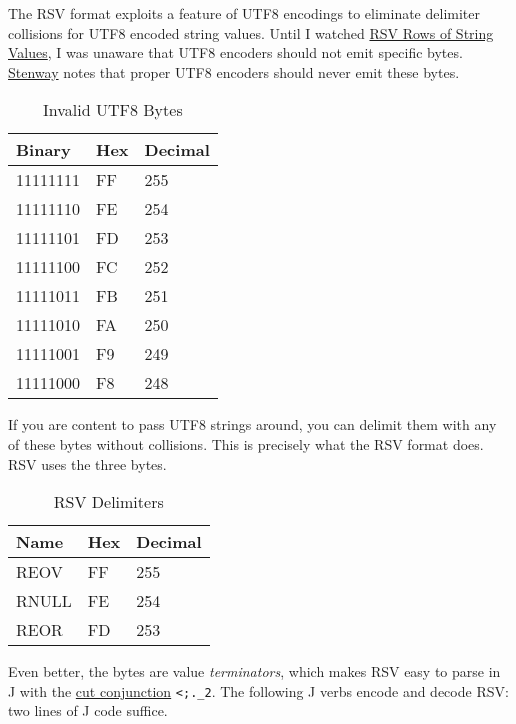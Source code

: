 The RSV format exploits a feature of UTF8 encodings to eliminate
delimiter collisions for UTF8 encoded string values. Until I watched
\href{https://www.youtube.com/watch?v=tb_70o6ohMA}{RSV Rows of String
Values}, I was unaware that UTF8 encoders should not emit specific
bytes. \href{https://github.com/Stenway}{Stenway} notes that proper UTF8 encoders should never emit these bytes.

\begin{longtable}[]{@{}lll@{}}
\caption{Invalid UTF8 Bytes}\\ 
\toprule
Binary & Hex & Decimal \\
\midrule
\endhead
11111111 & FF & 255 \\
11111110 & FE & 254 \\
11111101 & FD & 253 \\
11111100 & FC & 252 \\
11111011 & FB & 251 \\
11111010 & FA & 250 \\
11111001 & F9 & 249 \\
11111000 & F8 & 248 \\
\bottomrule
\end{longtable}

If you are content to pass UTF8 strings around, you can delimit them
with any of these bytes without collisions. This is precisely what the
RSV format does. RSV uses the three bytes.

\begin{longtable}[]{@{}lll@{}}
\caption{RSV Delimiters}\\ 
\toprule
Name & Hex & Decimal \\
\midrule
\endhead
REOV & FF & 255 \\
RNULL & FE & 254 \\
REOR & FD & 253 \\
\bottomrule
\end{longtable}

Even better, the bytes are value \emph{terminators}, which makes RSV
easy to parse in J with the
\href{https://code.jsoftware.com/wiki/Vocabulary/semidot}{cut
conjunction} \texttt{\textless{};.\_2}. The following J verbs encode and
decode RSV: two lines of J code suffice.

